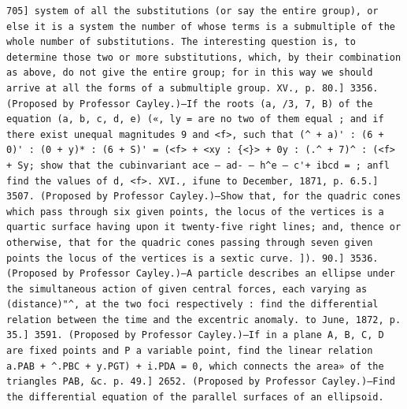 \documentclass[12pt]{article}
\theoremstyle{plain}
\begin{document}
\newpage
\setcounter{page}{575}
\begin{verbatim}
705] system of all the substitutions (or say the entire group), or else it is a system the number of whose terms is a submultiple of the whole number of substitutions. The interesting question is, to determine those two or more substitutions, which, by their combination as above, do not give the entire group; for in this way we should arrive at all the forms of a submultiple group. XV., p. 80.] 3356. (Proposed by Professor Cayley.)—If the roots (a, /3, 7, B) of the equation (a, b, c, d, e) («, ly = are no two of them equal ; and if there exist unequal magnitudes 9 and <f>, such that (^ + a)' : (6 + 0)' : (0 + y)* : (6 + S)' = (<f> + <xy : {<}> + 0y : (.^ + 7)^ : (<f> + Sy; show that the cubinvariant ace — ad- — h^e — c'+ ibcd = ; anfl find the values of d, <f>. XVI., ifune to December, 1871, p. 6.5.] 3507. (Proposed by Professor Cayley.)—Show that, for the quadric cones which pass through six given points, the locus of the vertices is a quartic surface having upon it twenty-five right lines; and, thence or otherwise, that for the quadric cones passing through seven given points the locus of the vertices is a sextic curve. ]). 90.] 3536. (Proposed by Professor Cayley.)—A particle describes an ellipse under the simultaneous action of given central forces, each varying as (distance)"^, at the two foci respectively : find the differential relation between the time and the excentric anomaly. to June, 1872, p. 35.] 3591. (Proposed by Professor Cayley.)—If in a plane A, B, C, D are fixed points and P a variable point, find the linear relation a.PAB + ^.PBC + y.PGT) + i.PDA = 0, which connects the area» of the triangles PAB, &c. p. 49.] 2652. (Proposed by Professor Cayley.)—Find the differential equation of the parallel surfaces of an ellipsoid. 
\end{verbatim}
\end{document}
